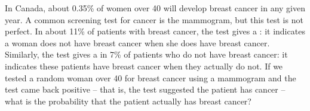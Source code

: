 \begin{examplewrap}
\begin{nexample}{In Canada, about 0.35\% of women over 40
    will develop breast cancer in any given year.
    A common screening test for cancer is the mammogram,
    but this test is not perfect.
    In about 11\% of patients with breast cancer, the test
    gives a :
    it indicates a woman does not have breast cancer when
    she does have breast cancer.
    Similarly, the test gives a 
    in 7\% of patients who do not have breast cancer:
    it indicates these patients have breast cancer when
    they actually do not.
    If we tested a random woman over 40 for breast cancer
    using a mammogram and the test came back positive
    -- that is, the test suggested the patient has cancer --
    what is the probability that the patient actually has
    breast cancer?}

\label{probBreastCancerGivenPositiveTestExample}


\end{nexample}
\end{examplewrap}

